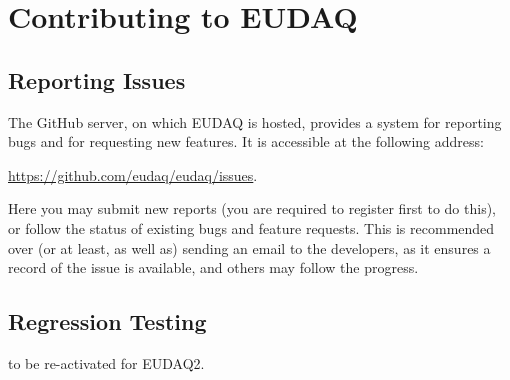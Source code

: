 \section{Contributing to EUDAQ}
\label{sec:contributing}

\subsection{Reporting Issues}
\label{sec:reporting}
The GitHub server, on which EUDAQ is hosted, provides a system for reporting bugs and for requesting new features.
It is accessible at the following address: 

\url{https://github.com/eudaq/eudaq/issues}.

Here you may submit new reports (you are required to register first to do this),
or follow the status of existing bugs and feature requests.
This is recommended over (or at least, as well as) sending an email to the developers,
as it ensures a record of the issue is available, and others may follow the progress.

\subsection{Regression Testing}
\label{sec:ctest}

to be re-activated for EUDAQ2.

%
%
%
%

